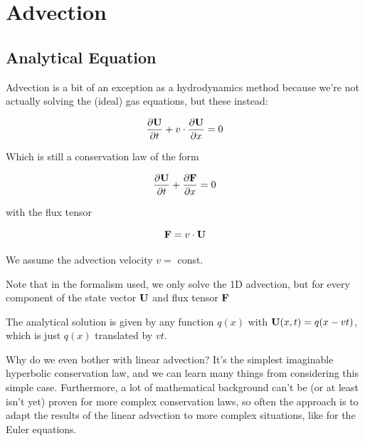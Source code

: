 \newpage
\section{Advection}



\subsection{Analytical Equation}

Advection is a bit of an exception as a hydrodynamics method because we're not actually solving the (ideal) gas equations, but these instead:

\begin{equation}
	\frac{\partial  \mathbf{U} }{\partial t} + v \cdot \frac{\partial \mathbf{U}}{\partial x} = 0
\end{equation}


Which is still a conservation law of the form

\begin{equation}
	\frac{\partial  \mathbf{U} }{\partial t} + \frac{\partial \mathbf{F}}{\partial x} = 0
\end{equation}

with the flux tensor 

\begin{equation}
	\mathbf{F} = v \cdot \mathbf{U}
\end{equation}

We assume the advection velocity $v = $ const.

Note that in the formalism used, we only solve the 1D advection, but for every component of the state vector $\mathbf{U}$ and flux tensor $\mathbf{F}$

The analytical solution is given by any function $q(x)$ with $\mathbf{U}(x,t) = q(x - v t)$, which is just $q(x)$ translated by $v t$.


Why do we even bother with linear advection?
It's the simplest imaginable hyperbolic conservation law, and we can learn many things from considering this simple case.
Furthermore, a lot of mathematical background can't be (or at least isn't yet) proven for more complex conservation laws, so often the approach is to adapt the results of the linear advection to more complex situations, like for the Euler equations.







